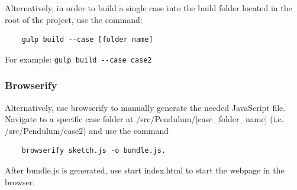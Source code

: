 \noindent Alternatively, in order to build a single case into the build folder located in the root of the project, use the command:
\begin{lstlisting}
    gulp build --case [folder name]
\end{lstlisting}
For example: \lstinline{gulp build --case case2}

\subsubsection{Browserify}
Alternatively, use browserify to manually generate the needed JavaScript file. Navigate to a specific case folder at /src/Pendulum/[case\_folder\_name] (i.e. /src/Pendulum/case2)
and use the command
\begin{lstlisting}
    browserify sketch.js -o bundle.js. 
\end{lstlisting}
After bundle.js is generated, use start index.html to start the webpage in the browser.

